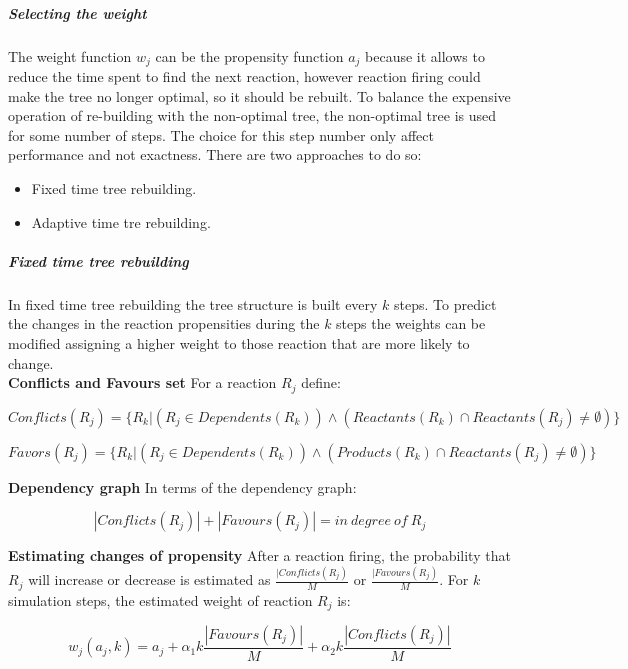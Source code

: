         \subparagraph{Selecting the weight}
        The weight function $w_j$ can be the propensity function $a_j$ because it allows to reduce the time spent to find the next reaction, however reaction firing could make the tree no longer optimal, so it should be rebuilt.
        To balance the expensive operation of re-building with the non-optimal tree, the non-optimal tree is used for some number of steps.
        The choice for this step number only affect performance and not exactness.
        There are two approaches to do so:

        \begin{multicols}{2}
          \begin{itemize}
            \item Fixed time tree rebuilding.
            \item Adaptive time tre rebuilding.
          \end{itemize}
        \end{multicols}

        \subparagraph{Fixed time tree rebuilding}
        In fixed time tree rebuilding the tree structure is built every $k$ steps.
        To predict the changes in the reaction propensities during the $k$ steps the weights can be modified assigning a higher weight to those reaction that are more likely to change.\\

          \textbf{Conflicts and Favours set}
          For a reaction $R_j$ define:

          $$Conflicts(R_j) = \{R_k|(R_j\in Dependents(R_k))\land(Reactants(R_k)\cap Reactants(R_j)\neq\emptyset)\}$$

          $$Favors(R_j) = \{R_k|(R_j\in Dependents(R_k))\land (Products(R_k)\cap Reactants(R_j)\neq\emptyset)\}$$

          \textbf{Dependency graph}
          In terms of the dependency graph:

          $$|Conflicts(R_j)| + |Favours(R_j)| = in\ degree\ of\ R_j$$

          \textbf{Estimating changes of propensity}
          After a reaction firing, the probability that $R_j$ will increase or decrease is estimated as $\frac{|Conflicts(R_j)}{M}$ or $\frac{|Favours(R_j)}{M}$.
          For $k$ simulation steps, the estimated weight of reaction $R_j$ is:

          $$w_j(a_j, k) = a_j + \alpha_1 k\frac{|Favours(R_j)|}{M} + \alpha_2 k\frac{|Conflicts(R_j)|}{M}$$

